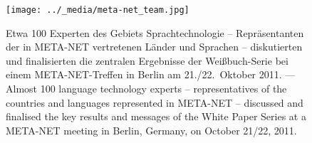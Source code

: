 \documentclass[]{../../metanetpaper}
\begin{document}
\begin{Parallel}[c]{79mm}{78mm}
\begin{figure}[h!]
  \center
  \texttt{[image: ../\_media/meta-net\_team.jpg]}
  \caption{Etwa 100 Experten des Gebiets Sprachtechnologie -- Repräsentanten der in META-NET vertretenen Länder und Sprachen -- diskutierten und finalisierten die zentralen Ergebnisse der Weißbuch-Serie bei einem META-NET-Treffen in Berlin am 21./22.~Oktober 2011.  --- %
    Almost 100 language technology experts -- representatives of the countries and languages represented in META-NET -- discussed and finalised the key results and messages of the White Paper Series at a META-NET meeting in Berlin, Germany, on October 21/22, 2011.}
\end{figure}



  \clearpage
  
  

\cleardoublepage



\end{Parallel}
\end{document}
